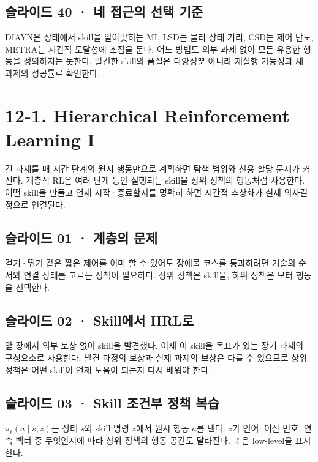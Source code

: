 \documentclass[11pt,a4paper]{article}
\begin{document}
\subsection{슬라이드 40 · 네 접근의 선택 기준}

DIAYN은 상태에서 skill을 알아맞히는 MI, LSD는 물리 상태 거리, CSD는 제어 난도, METRA는 시간적 도달성에 초점을 둔다. 어느 방법도 외부 과제 없이 모든 유용한 행동을 정의하지는 못한다. 발견한 skill의 품질은 다양성뿐 아니라 재실행 가능성과 새 과제의 성공률로 확인한다.\par

\clearpage
\section{12-1. Hierarchical Reinforcement Learning I}


긴 과제를 매 시간 단계의 원시 행동만으로 계획하면 탐색 범위와 신용 할당 문제가 커진다. 계층적 RL은 여러 단계 동안 실행되는 skill을 상위 정책의 행동처럼 사용한다. 어떤 skill을 만들고 언제 시작·종료할지를 명확히 하면 시간적 추상화가 실제 의사결정으로 연결된다.\par

\subsection{슬라이드 01 · 계층의 문제}

걷기·뛰기 같은 짧은 제어를 이미 할 수 있어도 장애물 코스를 통과하려면 기술의 순서와 연결 상태를 고르는 정책이 필요하다. 상위 정책은 skill을, 하위 정책은 모터 행동을 선택한다.\par

\subsection{슬라이드 02 · Skill에서 HRL로}

앞 장에서 외부 보상 없이 skill을 발견했다. 이제 이 skill을 목표가 있는 장기 과제의 구성요소로 사용한다. 발견 과정의 보상과 실제 과제의 보상은 다를 수 있으므로 상위 정책은 어떤 skill이 언제 도움이 되는지 다시 배워야 한다.\par

\subsection{슬라이드 03 · Skill 조건부 정책 복습}

$\pi_\ell(a\mid s,z)$는 상태 $s$와 skill 명령 $z$에서 원시 행동 $a$를 낸다. $z$가 언어, 이산 번호, 연속 벡터 중 무엇인지에 따라 상위 정책의 행동 공간도 달라진다. $\ell$은 low-level을 표시한다.\par
\end{document}
